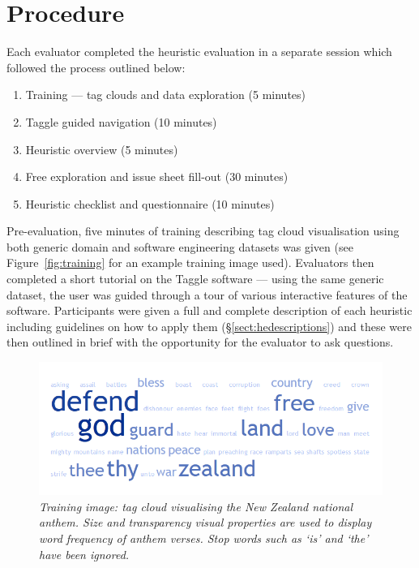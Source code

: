 \section{Procedure}\label{sect:heuristicprocedure}

Each evaluator completed the heuristic evaluation in a separate session which followed the process outlined below:

\begin{enumerate}
	\item Training --- tag clouds and data exploration (5 minutes)
	\item Taggle guided navigation (10 minutes)
	\item Heuristic overview (5 minutes)
	\item Free exploration and issue sheet fill-out (30 minutes) 
	\item Heuristic checklist and questionnaire (10 minutes)
\end{enumerate}

Pre-evaluation, five minutes of training describing tag cloud visualisation using both generic domain and software engineering datasets was given (see Figure~\vref{fig:training} for an example training image used). Evaluators then completed a short tutorial on the Taggle software --- using the same generic dataset, the user was guided through a tour of various interactive features of the software. Participants were given a full and complete description of each heuristic including guidelines on how to apply them (\S\ref{sect:hedescriptions}) and these were then outlined in brief with the opportunity for the evaluator to ask questions.

\begin{figure}[!htb]
	\centering
	\includegraphics[scale=0.80]{nationalanthem.png}
	\caption{\textit{Training image: tag cloud visualising the New Zealand national anthem. Size and transparency visual properties are used to display word frequency of anthem verses. Stop words such as `is' and `the' have been ignored.}}
	\label{fig:training}
\end{figure}

